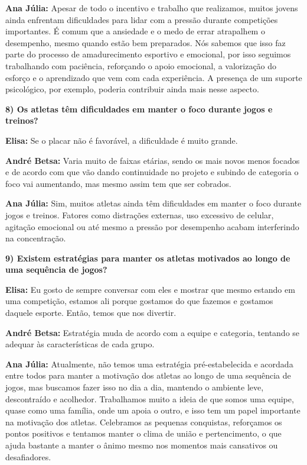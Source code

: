 \textbf{Ana Júlia:} Apesar de todo o incentivo e trabalho que realizamos, muitos jovens ainda enfrentam dificuldades para lidar com a pressão durante competições importantes. É comum que a ansiedade e o medo de errar atrapalhem o desempenho, mesmo quando estão bem preparados. Nós sabemos que isso faz parte do processo de amadurecimento esportivo e emocional, por isso seguimos trabalhando com paciência, reforçando o apoio emocional, a valorização do esforço e o aprendizado que vem com cada experiência. A presença de um suporte psicológico, por exemplo, poderia contribuir ainda mais nesse aspecto.

\textbf{8) Os atletas têm dificuldades em manter o foco durante jogos e treinos?}

\textbf{Elisa:} Se o placar não é favorável, a dificuldade é muito grande.

\textbf{André Betsa:} Varia muito de faixas etárias, sendo os mais novos menos focados e de acordo com que vão dando continuidade no projeto e subindo de categoria o foco vai aumentando, mas mesmo assim tem que ser cobrados.

\textbf{Ana Júlia:} Sim, muitos atletas ainda têm dificuldades em manter o foco durante jogos e treinos. Fatores como distrações externas, uso excessivo de celular, agitação emocional ou até mesmo a pressão por desempenho acabam interferindo na concentração.

\textbf{9) Existem estratégias para manter os atletas motivados ao longo de uma sequência de jogos?}

\textbf{Elisa:} Eu gosto de sempre conversar com eles e mostrar que mesmo estando em uma competição, estamos ali porque gostamos do que fazemos e gostamos daquele esporte. Então, temos que nos divertir.

\textbf{André Betsa:} Estratégia muda de acordo com a equipe e categoria, tentando se adequar às características de cada grupo.

\textbf{Ana Júlia:} Atualmente, não temos uma estratégia pré-estabelecida e acordada entre todos para manter a motivação dos atletas ao longo de uma sequência de jogos, mas buscamos fazer isso no dia a dia, mantendo o ambiente leve, descontraído e acolhedor. Trabalhamos muito a ideia de que somos uma equipe, quase como uma família, onde um apoia o outro, e isso tem um papel importante na motivação dos atletas. Celebramos as pequenas conquistas, reforçamos os pontos positivos e tentamos manter o clima de união e pertencimento, o que ajuda bastante a manter o ânimo mesmo nos momentos mais cansativos ou desafiadores.

